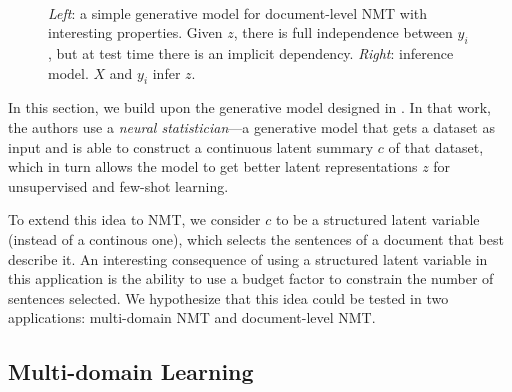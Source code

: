 \begin{figure}[t]
    \centering
    ~

    \caption{{\it Left}: a simple generative model for document-level
    NMT with interesting properties. Given $z$, there is full
    independence between $y_i$, but at test time there is an implicit
    dependency.
    {\it Right}: inference model. $X$ and $y_i$ infer $z$.}
    \label{fig:doclevel}
\end{figure}

In this section, we build upon the generative model designed in
\citet{edwards2017prociclr}. In that work, the authors use a {\it
neural statistician}---a generative model that gets a dataset as
input and is able to construct a continuous latent summary $c$ of
that dataset, which in turn allows the model to get better latent
representations $z$ for unsupervised and few-shot learning.

To extend this idea to NMT, we consider $c$ to be a structured latent
variable (instead of a continous one), which selects the sentences of
a document that best describe it. An interesting consequence of using
a structured latent variable in this application is the ability to
use a budget factor to constrain the number of sentences selected. We
hypothesize that this idea could be tested in two applications:
multi-domain NMT and document-level NMT.

\subsection{Multi-domain Learning}

